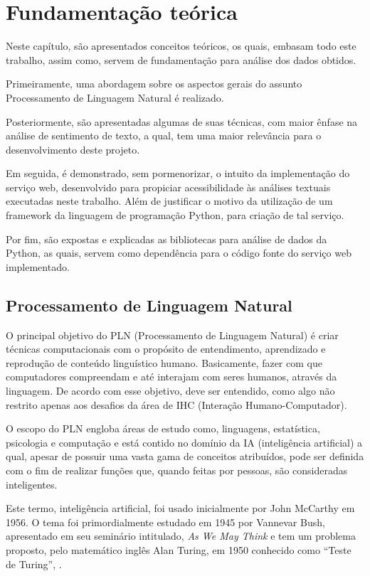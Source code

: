 \chapter{Fundamentação teórica}

Neste capítulo, são apresentados conceitos teóricos, os quais, embasam todo este trabalho, assim como, servem de fundamentação para análise dos dados obtidos. 

Primeiramente, uma abordagem sobre os aspectos gerais do assunto Processamento de Linguagem Natural  é realizado.

Posteriormente, são apresentadas algumas de suas técnicas, com maior ênfase na análise de sentimento de texto, a qual, tem uma maior relevância para o desenvolvimento deste projeto. 

Em seguida, é demonstrado, sem pormenorizar, o intuito da implementação do serviço web, desenvolvido para propiciar acessibilidade às análises textuais executadas neste trabalho. Além de justificar o motivo da utilização de um framework da linguagem de programação Python, para criação de tal serviço. 

Por fim, são expostas e explicadas as bibliotecas para análise de dados da Python, as quais, servem como dependência para o código fonte do serviço web implementado.

\section{Processamento de Linguagem Natural}

O principal objetivo do PLN (Processamento de Linguagem Natural) é criar técnicas computacionais com o propósito de entendimento, aprendizado e reprodução de conteúdo linguístico humano. Basicamente, fazer com que computadores compreendam e até interajam com seres humanos, através da linguagem. De acordo com \cite{surveyPLN} esse objetivo, deve ser entendido, como algo não restrito apenas aos desafios da área de IHC (Interação Humano-Computador)\cite{ihc}.

O escopo do PLN engloba áreas de estudo como, linguagens, estatística, psicologia e computação e está contido no domínio da IA (inteligência artificial) a qual, apesar de possuir uma vasta gama de conceitos atribuídos, pode ser definida com o fim de realizar funções que, quando feitas por pessoas, são consideradas inteligentes.

Este termo, inteligência artificial, foi usado inicialmente por John McCarthy em 1956. O tema foi primordialmente estudado em 1945 por Vannevar Bush, apresentado em seu seminário intitulado, \textit{As We May Think} e tem um problema proposto, pelo matemático inglês Alan Turing, em 1950 conhecido como “Teste de Turing”, \cite{IA:06}. 


